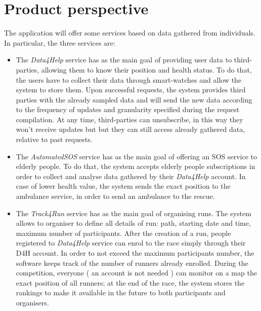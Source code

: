 \section{Product perspective}

The application will offer some services based on data gathered from individuals. In particular, the three services are:

\begin{itemize}
    \item The \emph{Data4Help} service has as the main goal of providing user data to third-parties, allowing them to know their position and health status.
    To do that, the users have to collect their data through smart-watches and allow the system to store them. Upon successful requests, the system provides third parties with the already sampled data and will send the new data according to the frequency of updates and granularity specified during the request compilation.
    At any time, third-parties can unsubscribe, in this way they won't receive updates but but they can still access already gathered data, relative to past requests.
    \item The \emph{AutomatedSOS} service has as the main goal of offering an SOS service to elderly people. To do that, the system accepts elderly people subscriptions in order to collect and analyse data gathered by their \emph{Data4Help} account. In case of lower health value, the system sends the exact position to the ambulance service, in order to send an ambulance to the rescue.
    \item The \emph{Track4Run} service has as the main goal of organising runs. The system allows to organiser to define all details of run: path, starting date and time, maximum number of participants. After the creation of a run, people registered to \emph{Data4Help} service can enrol to the race simply through their D4H account. In order to not exceed the maximum participants number, the software keeps track of the number of runners already enrolled. During the competition, everyone ( an account is not needed ) can monitor on a map the exact position of all runners; at the end of the race, the system stores the rankings to make it available in the future to both participants and organisers. 
\end{itemize}


